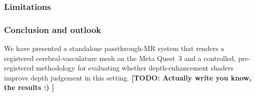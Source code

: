 \documentclass[runningheads]{llncs}
\begin{document}
\subsubsection{Limitations}



\subsubsection{Conclusion and outlook}
We have presented a standalone passthrough-MR system that renders a registered cerebral-vasculature mesh on the Meta Quest~3 and a controlled, pre-registered methodology for evaluating whether depth-enhancement shaders improve depth judgement in this setting. \textbf{[TODO: Actually write you know, the results :) ]}

%
%


\end{document}
